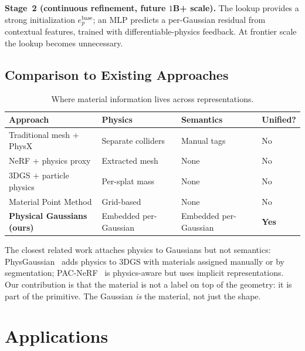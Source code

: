 \documentclass[twoside,11pt]{article}
\begin{document}
\textbf{Stage~2 (continuous refinement, future $1$B+ scale).}
The lookup provides a strong initialization $e_p^{\text{base}}$; an MLP predicts a per-Gaussian residual from contextual features, trained with differentiable-physics feedback. At frontier scale the lookup becomes unnecessary.

\subsection{Comparison to Existing Approaches}

\begin{table}[t]
\centering
\caption{Where material information lives across representations.}
\label{tab:compare}
\begin{tabular}{llll}
\toprule
Approach & Physics & Semantics & Unified? \\
\midrule
Traditional mesh + PhysX & Separate colliders & Manual tags & No \\
NeRF + physics proxy & Extracted mesh & None & No \\
3DGS + particle physics & Per-splat mass & None & No \\
Material Point Method & Grid-based & None & No \\
\textbf{Physical Gaussians (ours)} & Embedded per-Gaussian & Embedded per-Gaussian & \textbf{Yes} \\
\bottomrule
\end{tabular}
\end{table}

The closest related work attaches physics to Gaussians but not semantics: PhysGaussian~\citep{xie2024physgaussian} adds physics to 3DGS with materials assigned manually or by segmentation; PAC-NeRF~\citep{li2023pacnerf} is physics-aware but uses implicit representations. Our contribution is that the material is not a label on top of the geometry: it is part of the primitive. The Gaussian \emph{is} the material, not just the shape.

\section{Applications}
\end{document}
